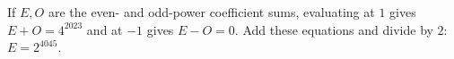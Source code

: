 If $E,O$ are the even- and odd-power coefficient sums, evaluating at $1$ gives $E+O=4^{2023}$ and at $-1$ gives $E-O=0$. Add these equations and divide by $2$: $\boxed{E=2^{4045}}$.
